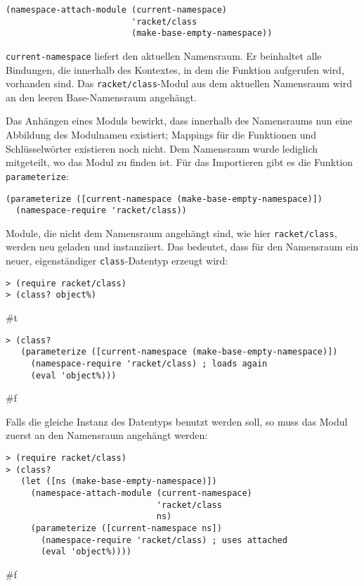 \begin{lstlisting}
(namespace-attach-module (current-namespace)
                         'racket/class
                         (make-base-empty-namespace))
\end{lstlisting}

\texttt{current-namespace} liefert den aktuellen Namensraum. Er beinhaltet alle Bindungen, die innerhalb des Kontextes, in dem die Funktion aufgerufen wird, vorhanden sind. Das \texttt{racket/class}-Modul aus dem aktuellen Namensraum wird an den leeren Base-Namensraum angehängt.

Das Anhängen eines Moduls bewirkt, dass innerhalb des Namensraums nun eine Abbildung des Modulnamen existiert; Mappings für die Funktionen und Schlüsselwörter existieren noch nicht. Dem Namensraum wurde lediglich mitgeteilt, wo das Modul zu finden ist. Für das Importieren gibt es die Funktion \texttt{parameterize}:

\begin{lstlisting}
(parameterize ([current-namespace (make-base-empty-namespace)])
  (namespace-require 'racket/class))
\end{lstlisting}

Module, die nicht dem Namensraum angehängt sind, wie hier \texttt{racket/class}, werden neu geladen und instanziiert. Das bedeutet, dass für den Namensraum ein neuer, eigenständiger \texttt{class}-Datentyp erzeugt wird:

\begin{lstlisting}
> (require racket/class)
> (class? object%)
\end{lstlisting}
{\routput \#t}

\begin{lstlisting}
> (class?
   (parameterize ([current-namespace (make-base-empty-namespace)])
     (namespace-require 'racket/class) ; loads again
     (eval 'object%)))
\end{lstlisting}
{\routput \#f}

Falls die gleiche Instanz des Datentyps benutzt werden soll, so muss das Modul zuerst an den Namensraum angehängt werden:

\begin{lstlisting}
> (require racket/class)
> (class?
   (let ([ns (make-base-empty-namespace)])
     (namespace-attach-module (current-namespace)
                              'racket/class
                              ns)
     (parameterize ([current-namespace ns])
       (namespace-require 'racket/class) ; uses attached
       (eval 'object%))))
\end{lstlisting}
{\routput \#f}


